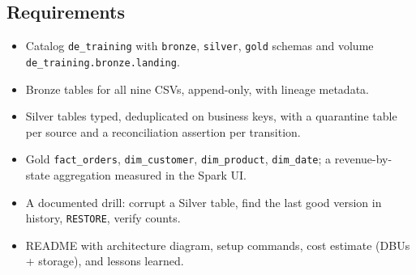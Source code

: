 \subsection*{Requirements}
\begin{itemize}
    \item Catalog \texttt{de\_training} with \texttt{bronze}, \texttt{silver}, \texttt{gold} schemas and volume \texttt{de\_training.bronze.landing}.
    \item Bronze tables for all nine CSVs, append-only, with lineage metadata.
    \item Silver tables typed, deduplicated on business keys, with a quarantine table per source and a reconciliation assertion per transition.
    \item Gold \texttt{fact\_orders}, \texttt{dim\_customer}, \texttt{dim\_product}, \texttt{dim\_date}; a revenue-by-state aggregation measured in the Spark UI.
    \item A documented drill: corrupt a Silver table, find the last good version in history, \texttt{RESTORE}, verify counts.
    \item README with architecture diagram, setup commands, cost estimate (DBUs + storage), and lessons learned.
\end{itemize}

